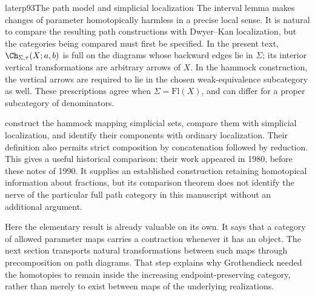 \begin{dcomment}{later}{p93}{The path model and simplicial localization}
The interval lemma makes changes of parameter homotopically harmless in a precise local sense. It is natural to compare the resulting path constructions with Dwyer--Kan localization, but the categories being compared must first be specified. In the present text, $\Ch_{\Sigma,\tau}(X;a,b)$ is full on the diagrams whose backward edges lie in $\Sigma$; its interior vertical transformations are arbitrary arrows of $X$. In the hammock construction, the vertical arrows are required to lie in the chosen weak-equivalence subcategory as well. These prescriptions agree when $\Sigma=\mathrm{Fl}(X)$, and can differ for a proper subcategory of denominators.

\citet[Definition~2.1, Proposition~2.2 and Proposition~3.1]{DwyerKan1980Calculating} construct the hammock mapping simplicial sets, compare them with simplicial localization, and identify their components with ordinary localization. Their definition also permits strict composition by concatenation followed by reduction. This gives a useful historical comparison: their work appeared in 1980, before these notes of 1990. It supplies an established construction retaining homotopical information about fractions, but its comparison theorem does not identify the nerve of the particular full path category in this manuscript without an additional argument.

Here the elementary result is already valuable on its own. It says that a category of allowed parameter maps carries a contraction whenever it has an object. The next section transports natural transformations between such maps through precomposition on path diagrams. That step explains why Grothendieck needed the homotopies to remain inside the increasing endpoint-preserving category, rather than merely to exist between maps of the underlying realizations.
\end{dcomment}


